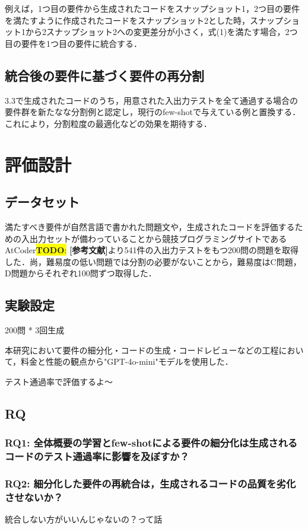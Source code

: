 \documentclass[submit,techrep,noauthor]{ipsj}
\newcommand{\todo}[1]{\colorbox{yellow}{{\bf TODO}:}{\color{red} {\textbf{[#1]}}}}
\begin{document}
例えば，1つ目の要件から生成されたコードをスナップショット1，2つ目の要件を満たすように作成されたコードをスナップショット2とした時，スナップショット1から2スナップショット2への変更差分が小さく，式(1)を満たす場合，2つ目の要件を1つ目の要件に統合する．

\subsection{統合後の要件に基づく要件の再分割}
3.3で生成されたコードのうち，用意された入出力テストを全て通過する場合の要件群を新たなな分割例と認定し，現行のfew-shotで与えている例と置換する．これにより，分割粒度の最適化などの効果を期待する．

\section{評価設計}
\subsection{データセット}
満たすべき要件が自然言語で書かれた問題文や，生成されたコードを評価するための入出力セットが備わっていることから競技プログラミングサイトであるAtCoder\todo{参考文献}より541件の入出力テストをもつ200問の問題を取得した．尚，難易度の低い問題では分割の必要がないことから，難易度はC問題，D問題からそれぞれ100問ずつ取得した．

\subsection{実験設定}
200問 * 3回生成

本研究において要件の細分化・コードの生成・コードレビューなどの工程において，料金と性能の観点から"GPT-4o-mini"モデルを使用した．

テスト通過率で評価するよ〜

\subsection{RQ}
\subsubsection{RQ1: 全体概要の学習とfew-shotによる要件の細分化は生成されるコードのテスト通過率に影響を及ぼすか？}
\subsubsection{RQ2: 細分化した要件の再統合は，生成されるコードの品質を劣化させないか？}
統合しない方がいいんじゃないの？って話
\end{document}
